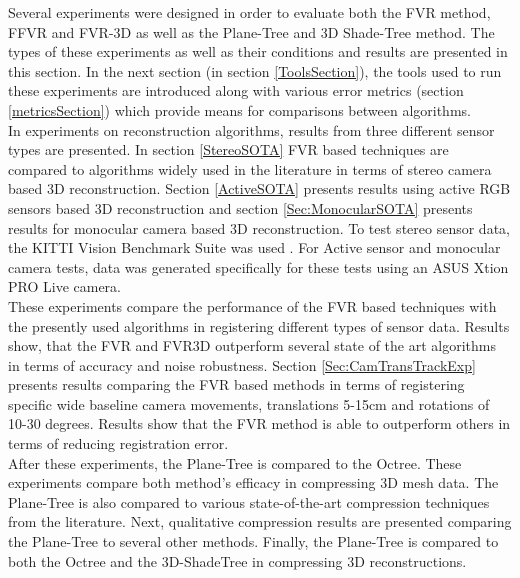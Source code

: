 Several experiments were designed in order to evaluate both the FVR method, FFVR and FVR-3D as well as the Plane-Tree and 3D Shade-Tree method. The types of these experiments as well as their conditions and results are presented in this section. In the next section (in section \ref{ToolsSection}), the tools used to run these experiments are introduced along with various error metrics (section \ref{metricsSection}) which provide means for comparisons between algorithms. \\

In experiments on reconstruction algorithms, results from three different sensor types are presented. In section \ref{StereoSOTA} FVR based techniques are compared to algorithms widely used in the literature in terms of stereo camera based 3D reconstruction. Section \ref{ActiveSOTA} presents results using active RGB sensors based 3D reconstruction and section \ref{Sec:MonocularSOTA} presents results for monocular camera based 3D reconstruction. To test stereo sensor data, the KITTI Vision Benchmark Suite was used \cite{Geiger13Vision}. For Active sensor and monocular camera tests, data was generated specifically for these tests using an ASUS Xtion PRO Live camera. \\

These experiments compare the performance of the FVR based techniques with the presently used algorithms in registering different types of sensor data. Results show, that the FVR and FVR3D outperform several state of the art algorithms in terms of accuracy and noise robustness. Section \ref{Sec:CamTransTrackExp} presents results comparing the FVR based methods in terms of registering specific wide baseline camera movements, translations 5-15cm and rotations of 10-30 degrees. Results show that the FVR method is able to outperform others in terms of reducing registration error. \\

After these experiments, the Plane-Tree is compared to the Octree. These experiments compare both method's efficacy in compressing 3D mesh data. The Plane-Tree is also compared to various state-of-the-art compression techniques from the literature. Next, qualitative compression results are presented comparing the Plane-Tree to several other methods. Finally, the Plane-Tree is compared to both the Octree and the 3D-ShadeTree in compressing 3D reconstructions. \\
